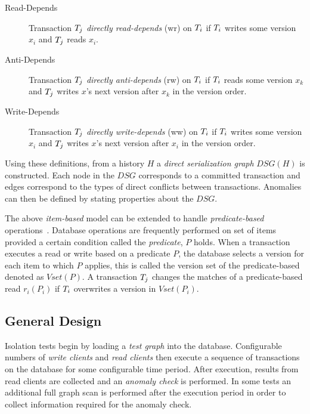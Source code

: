 \begin{description}
  \item[Read-Depends]
    Transaction $T_j$ \emph{directly read-depends} (\textsf{wr}) on 
    $T_i$ if $T_i$ writes some version $x_i$ and $T_j$ reads $x_i$.
  \item[Anti-Depends]
    Transaction $T_j$ \emph{directly anti-depends} (\textsf{rw}) on 
    $T_i$ if $T_i$ reads some version $x_k$ and $T_j$ writes 
    $x$'s next version after $x_k$ in the version order.
  \item[Write-Depends]
    Transaction $T_j$ \emph{directly write-depends} (\textsf{ww}) on 
    $T_i$ if $T_i$ writes some version $x_i$ and $T_j$ writes 
    $x$'s next version after $x_i$ in the version order.
\end{description}


Using these definitions, from a history $H$ a \emph{direct serialization graph} 
$\textit{DSG}(H)$ is constructed. Each node in the $\textit{DSG}$ corresponds to
a committed transaction and edges correspond to the types of direct conflicts 
between transactions. Anomalies can then be defined by stating properties about
the $\textit{DSG}$.

The above \emph{item-based} model can be extended to handle 
\emph{predicate-based} operations~\cite{adya1999weak}. Database operations are 
frequently performed on set of items provided a certain condition called the 
\emph{predicate}, $P$ holds. When a transaction executes a read or write based 
on a predicate $P$, the database selects a version for each item to which $P$ 
applies, this is called the version set of the predicate-based denoted as 
$\textit{Vset}(P)$. A transaction $T_j$ changes the matches of a 
predicate-based read $r_i(P_i)$ if $T_i$ overwrites a version 
in $\textit{Vset}(P_i)$.

\subsection{General Design}
\label{sec:design-cons}

Isolation tests begin by loading a \emph{test graph} into the database. 
Configurable numbers of \emph{write clients} and \emph{read clients} then 
execute a sequence of transactions on the database for some configurable time 
period. After execution, results from read clients are collected and an 
\emph{anomaly check} is performed. In some tests an additional full graph scan 
is performed after the execution period in order to collect information required 
for the anomaly check.

